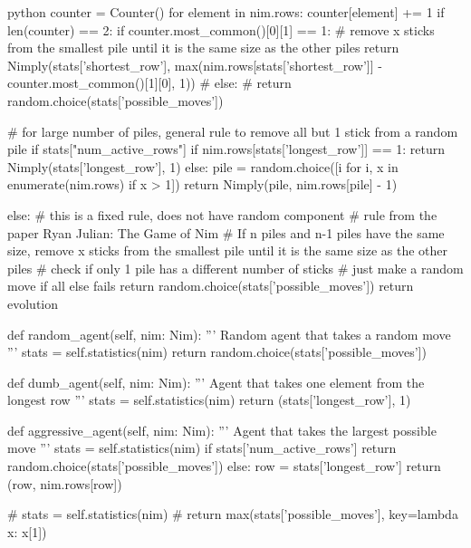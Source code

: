 \begin{mintedbox}{python}
            counter = Counter()
            for element in nim.rows:
                counter[element] += 1
            if len(counter) == 2:
                if counter.most_common()[0][1] == 1:
                    # remove x sticks from the smallest pile until it is the same size as the other piles
                    return Nimply(stats['shortest_row'], max(nim.rows[stats['shortest_row']] - counter.most_common()[1][0], 1))
                # else:
                #     return random.choice(stats['possible_moves'])

            # for large number of piles, general rule to remove all but 1 stick from a random pile
            if stats["num_active_rows"] %
                if nim.rows[stats['longest_row']] == 1:
                    return Nimply(stats['longest_row'], 1)
                else:
                    pile = random.choice([i for i, x in enumerate(nim.rows) if x > 1])
                    return Nimply(pile, nim.rows[pile] - 1)

            else:
                # this is a fixed rule, does not have random component
                # rule from the paper Ryan Julian: The Game of Nim
                # If n piles and n-1 piles have the same size, remove x sticks from the smallest pile until it is the same size as the other piles
                # check if only 1 pile has a different number of sticks
                # just make a random move if all else fails
                return random.choice(stats['possible_moves'])
        return evolution

    def random_agent(self, nim: Nim):
        '''
        Random agent that takes a random move
        '''
        stats = self.statistics(nim)
        return random.choice(stats['possible_moves'])

    def dumb_agent(self, nim: Nim):
        '''
        Agent that takes one element from the longest row
        '''
        stats = self.statistics(nim)
        return (stats['longest_row'], 1)

    def aggressive_agent(self, nim: Nim):
        '''
        Agent that takes the largest possible move
        '''
        stats = self.statistics(nim)
        if stats['num_active_rows'] %
            return random.choice(stats['possible_moves'])
        else:
            row = stats['longest_row']
            return (row, nim.rows[row])

        # stats = self.statistics(nim)
        # return max(stats['possible_moves'], key=lambda x: x[1])


\end{mintedbox}
